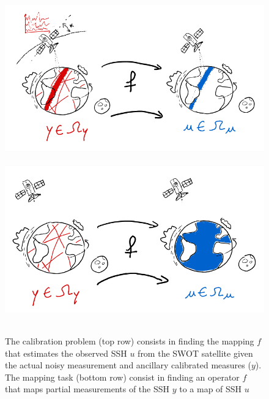 \begin{bibunit}
\begin{figure}[htbp]
\begin{center}
\begin{tabular}[c]
\includegraphics[width=0.8\linewidth]{Chapitre1/Ch1-Figures/Cal_drawing.png} \
\includegraphics[width=0.8\linewidth]{Chapitre1/Ch1-Figures/Mapping_drawing.png} \
\end{tabular}
\end{center}
\caption[Swot calibration and altimetry mapping problem illustration]
{\footnotesize The calibration problem (top row) consists in finding the mapping $f$ that estimates the observed SSH $u$ from the SWOT satellite given the actual noisy measurement and ancillary calibrated measures ($y$).
The mapping task (bottom row) consist in finding an operator $f$ that maps partial measurements of the SSH $y$ to a map of SSH $u$}
\label{fig:planet_drawings}
\end{figure}


\end{bibunit}
